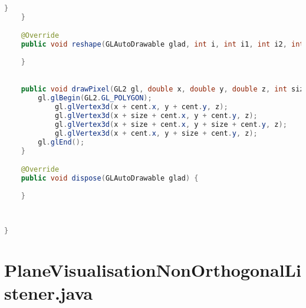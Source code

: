 \documentclass[pdftex,a4paper,10pt,titlepage]{article}
\begin{document}
\begin{lstlisting}[language=java, breaklines=true]
        }
    }

    @Override
    public void reshape(GLAutoDrawable glad, int i, int i1, int i2, int i3) {
        
    }

    
    public void drawPixel(GL2 gl, double x, double y, double z, int size, Point2D.Double cent){
        gl.glBegin(GL2.GL_POLYGON);
            gl.glVertex3d(x + cent.x, y + cent.y, z);
            gl.glVertex3d(x + size + cent.x, y + cent.y, z);
            gl.glVertex3d(x + size + cent.x, y + size + cent.y, z);
            gl.glVertex3d(x + cent.x, y + size + cent.y, z);
        gl.glEnd(); 
    }

    @Override
    public void dispose(GLAutoDrawable glad) {
    
    }
    
    
    
}

\end{lstlisting}


\section{PlaneVisualisationNonOrthogonalListener.java}
\end{document}
